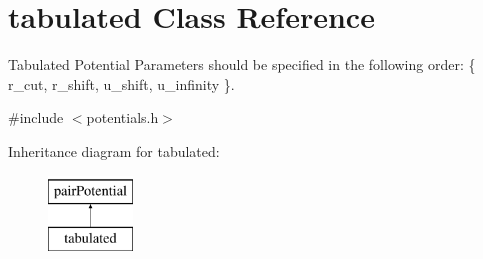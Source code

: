 \hypertarget{classtabulated}{}\section{tabulated Class Reference}
\label{classtabulated}


Tabulated Potential Parameters should be specified in the following order\+: \{ r\+\_\+cut, r\+\_\+shift, u\+\_\+shift, u\+\_\+infinity \}.  




{\ttfamily \#include $<$potentials.\+h$>$}

Inheritance diagram for tabulated\+:\begin{figure}[H]
\begin{center}
\leavevmode
\includegraphics[height=2.000000cm]{classtabulated}
\end{center}
\end{figure}
